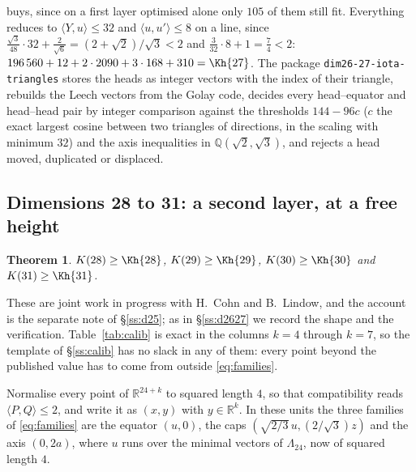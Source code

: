 \documentclass[11pt]{amsart}
\newtheorem{theorem}{Theorem}[section]
\theoremstyle{remark}
\newcommand{\Leech}{\Lambda_{24}}
\newcommand{\ip}[2]{\langle #1,#2\rangle}
\newcommand{\R}{\mathbb{R}}
\begin{document}
buys, since on a first layer optimised alone only $105$ of them still fit.  Everything reduces to
$\ip{Y}{u}\le32$ and $\ip{u}{u'}\le8$ on a line, since
$\tfrac{\sqrt3}{48}\cdot32+\tfrac{2}{\sqrt6}=(2+\sqrt2)/\sqrt3<2$ and
$\tfrac{3}{32}\cdot8+1=\tfrac74<2$:
$196\,560+12+2\cdot2090+3\cdot168+310=\Kh{27}$. The package
\texttt{dim26-27-iota-triangles} stores the heads as integer vectors with the
index of their triangle, rebuilds the Leech vectors from the Golay code, decides
every head--equator and head--head pair by integer comparison against the
thresholds $144-96c$ ($c$ the exact largest cosine between two triangles of
directions, in the scaling with minimum $32$) and the axis inequalities in
$\mathbb{Q}(\sqrt2,\sqrt3)$, and rejects a head moved, duplicated or displaced.

\subsection{Dimensions 28 to 31: a second layer, at a free
height}\label{ss:d293031}

\begin{theorem}\label{thm:293031}
$K(28)\ge\Kh{28}$, $K(29)\ge\Kh{29}$, $K(30)\ge\Kh{30}$ and
$K(31)\ge\Kh{31}$.
\end{theorem}

These are joint work in progress with H.~Cohn and B.~Lindow, and the account is
the separate note of \S\ref{ss:d25}; as in \S\ref{ss:d2627} we record the shape
and the verification. Table~\ref{tab:calib} is exact in the columns $k=4$
through $k=7$, so the template of \S\ref{ss:calib} has no slack in any of them:
every point beyond the published value has to come from outside
\eqref{eq:families}.

Normalise every point of $\R^{24+k}$ to squared length $4$, so that
compatibility reads $\ip{P}{Q}\le2$, and write it as $(x,y)$ with $y\in\R^{k}$.
In these units the three families of \eqref{eq:families} are the equator
$(u,0)$, the caps $(\sqrt{2/3}\,u,(2/\sqrt3)z)$ and the axis $(0,2a)$, where $u$
runs over the minimal vectors of $\Leech$, now of squared length $4$.
\end{document}
